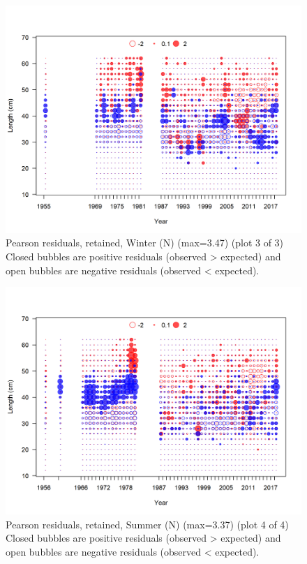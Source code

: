 \documentclass[12pt,]{article}
\begin{document}
\begin{figure}
\centering
\includegraphics{r4ss/plots_mod1/comp_lenfit_residsflt1mkt2_page3.png}
\caption{Pearson residuals, retained, Winter (N) (max=3.47) (plot 3 of
3)\\
Closed bubbles are positive residuals (observed \textgreater{} expected)
and open bubbles are negative residuals (observed \textless{} expected).
\label{fig:wn_len_pearson}}
\end{figure}

\begin{figure}
\centering
\includegraphics{r4ss/plots_mod1/comp_lenfit_residsflt2mkt2_page4.png}
\caption{Pearson residuals, retained, Summer (N) (max=3.37) (plot 4 of
4)\\
Closed bubbles are positive residuals (observed \textgreater{} expected)
and open bubbles are negative residuals (observed \textless{} expected).
\label{fig:sn_len_pearson}}
\end{figure}
\end{document}
